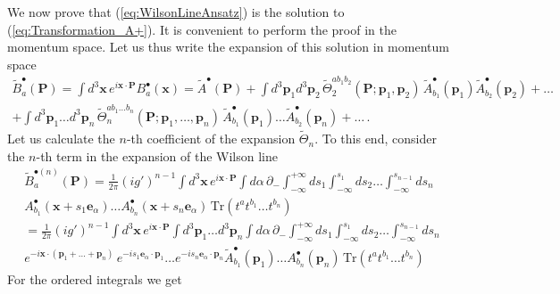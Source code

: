 \documentclass[english,american]{article}
\begin{document}
We now prove that (\ref{eq:WilsonLineAnsatz}) is the solution to
(\ref{eq:Transformation_A+}). It is convenient to perform the proof  in the momentum
space. Let us thus write the expansion of this solution in momentum
space
\begin{multline}
\tilde{B}_{a}^{\bullet}\left(\mathbf{P}\right)=\int d^{3}\mathbf{x}\, e^{i\mathbf{x}\cdot\mathbf{P}}B_{a}^{\bullet}\left(\mathbf{x}\right)=\tilde{A}^{\bullet}\left(\mathbf{P}\right)+\int d^{3}\mathbf{p}_{1}d^{3}\mathbf{p}_{2}\,\tilde{\Theta}_{2}^{ab_{1}b_{2}}\left(\mathbf{P};\mathbf{p}_{1},\mathbf{p}_{2}\right)\,\tilde{A}_{b_{1}}^{\bullet}\left(\mathbf{p}_{1}\right)\tilde{A}_{b_{2}}^{\bullet}\left(\mathbf{p}_{2}\right)+\dots\\
+\int d^{3}\mathbf{p}_{1}\dots d^{3}\mathbf{p}_{n}\,\tilde{\Theta}_{n}^{ab_{1}\dots b_{n}}\left(\mathbf{P};\mathbf{p}_{1},\dots,\mathbf{p}_{n}\right)\,\tilde{A}_{b_{1}}^{\bullet}\left(\mathbf{p}_{1}\right)\dots\tilde{A}_{b_{2}}^{\bullet}\left(\mathbf{p}_{n}\right)+\dots\,.\label{eq:WLexpansion}
\end{multline}
Let us calculate the $n$-th coefficient of the expansion $\tilde{\Theta}_{n}$.
To this end, consider the $n$-th term in the expansion of the Wilson
line 
\begin{multline}
\tilde{B}_{a}^{\bullet\left(n\right)}\left(\mathbf{P}\right)=\frac{1}{2\pi}\left(ig'\right)^{n-1}\int d^{3}\mathbf{x}\, e^{i\mathbf{x}\cdot\mathbf{P}}\int d\alpha\,\partial_{-}\int_{-\infty}^{+\infty}ds_{1}\int_{-\infty}^{s_{1}}ds_{2}\dots\int_{-\infty}^{s_{n-1}}ds_{n}\,\\
A_{b_{1}}^{\bullet}\left(\mathbf{x}+s_{1}\mathbf{e}_{\alpha}\right)\dots A_{b_{n}}^{\bullet}\left(\mathbf{x}+s_{n}\mathbf{e}_{\alpha}\right)\,\mathrm{Tr}\left(t^{a}t^{b_{1}}\dots t^{b_{n}}\right)\\
=\frac{1}{2\pi}\left(ig'\right)^{n-1}\int d^{3}\mathbf{x}\, e^{i\mathbf{x}\cdot\mathbf{P}}\int d^{3}\mathbf{p}_{1}\dots d^{3}\mathbf{p}_{n}\int d\alpha\,\partial_{-}\int_{-\infty}^{+\infty}ds_{1}\int_{-\infty}^{s_{1}}ds_{2}\dots\int_{-\infty}^{s_{n-1}}ds_{n}\\
e^{-i\mathbf{x}\cdot\left(\mathbf{p}_{1}+\dots+\mathbf{p}_{n}\right)}\, e^{-is_{1}\mathbf{e}_{\alpha}\cdot\mathbf{p}_{1}}\dots e^{-is_{n}\mathbf{e}_{\alpha}\cdot\mathbf{p}_{n}}\tilde{A}_{b_{1}}^{\bullet}\left(\mathbf{p}_{1}\right)\dots A_{b_{n}}^{\bullet}\left(\mathbf{p}_{n}\right)\,\mathrm{Tr}\left(t^{a}t^{b_{1}}\dots t^{b_{n}}\right)\label{eq:NthWLcoef}
\end{multline}
For the ordered integrals we get
\end{document}
